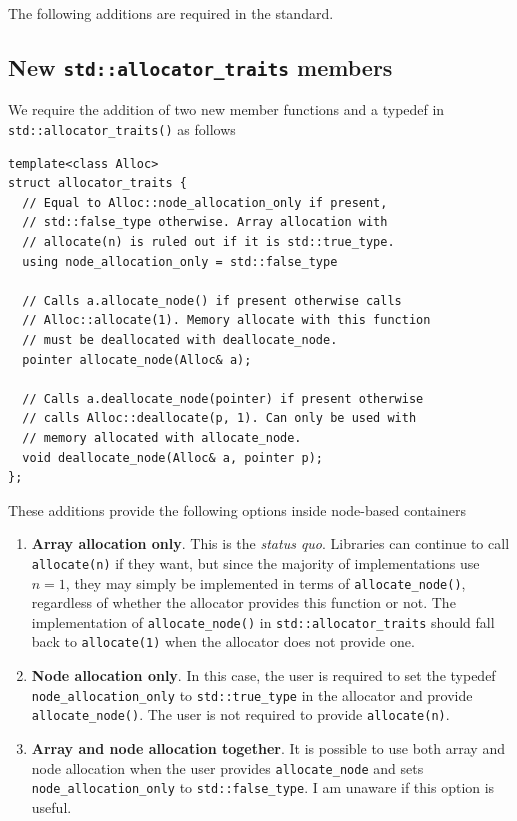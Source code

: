 \documentclass[11pt]{article}
\begin{document}
The following additions are required in the standard.

\subsection{New \texttt{std::allocator\_traits} members}

We require the addition of two new member functions and
a typedef in \texttt{std::allocator\_traits()} as follows

\medskip
\begin{lstlisting}
template<class Alloc>
struct allocator_traits {
  // Equal to Alloc::node_allocation_only if present,
  // std::false_type otherwise. Array allocation with
  // allocate(n) is ruled out if it is std::true_type.
  using node_allocation_only = std::false_type

  // Calls a.allocate_node() if present otherwise calls
  // Alloc::allocate(1). Memory allocate with this function
  // must be deallocated with deallocate_node.
  pointer allocate_node(Alloc& a);

  // Calls a.deallocate_node(pointer) if present otherwise
  // calls Alloc::deallocate(p, 1). Can only be used with
  // memory allocated with allocate_node.
  void deallocate_node(Alloc& a, pointer p);
};
\end{lstlisting}
These additions provide the following options inside node-based
containers
\begin{enumerate}
\item {\bf Array allocation only}.
This is the {\it status quo}. Libraries can continue to call
\texttt{allocate(n)} if they want, but since the majority of implementations
use $n = 1$, they may simply be implemented in terms of
\texttt{allocate\_node()}, regardless of whether the allocator provides this
function or not. The implementation of \texttt{allocate\_node()} in
\texttt{std::allocator\_traits} should fall back to \texttt{allocate(1)} 
when the allocator does not provide one.

\item {\bf Node allocation only}.
In this case, the user is required to set the typedef \texttt{node\_allocation\_only}
to \texttt{std::true\_type} in the allocator and provide \texttt{allocate\_node()}. The user is
not required to provide \texttt{allocate(n)}.
\item {\bf Array and node allocation together}. It is possible to use
both array {and} node allocation when the user provides \texttt{allocate\_node}
and sets \texttt{node\_allocation\_only} to \texttt{std::false\_type}.
I am unaware if this option is useful.
\end{enumerate}
\end{document}
